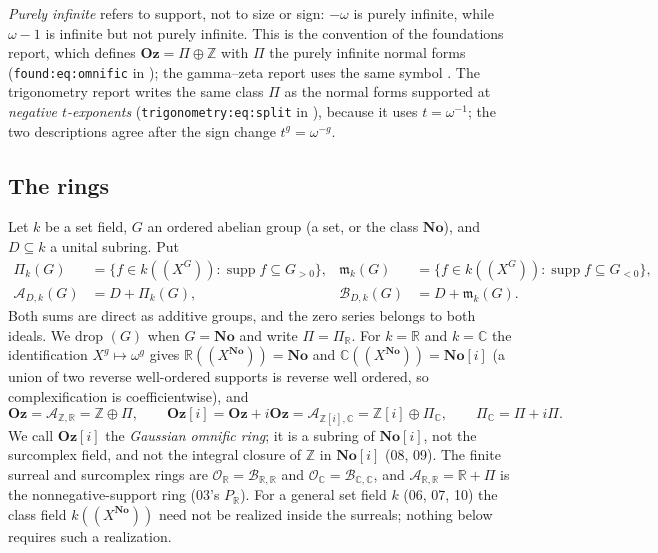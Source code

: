 \documentclass[11pt,letterpaper]{article}
\numberwithin{equation}{section}
\theoremstyle{definition}
\theoremstyle{remark}
\theoremstyle{plain}
\newcommand{\No}{\mathbf{No}}
\newcommand{\Oz}{\mathbf{Oz}}
\newcommand{\SC}{\No[i]}
\newcommand{\GOz}{\Oz[i]}
\newcommand{\Z}{\mathbb Z}
\newcommand{\R}{\mathbb R}
\newcommand{\C}{\mathbb C}
\newcommand{\A}{\mathcal A}          %
\newcommand{\B}{\mathcal B}          %
\newcommand{\mm}{\mathfrak m}        %
\newcommand{\OO}{\mathcal O}         %
\newcommand{\hahn}[2]{#1(\!(X^{#2})\!)}
\newcommand{\supp}{\operatorname{supp}}
\begin{document}
\emph{Purely infinite} refers to support, not to size or sign: $-\omega$ is purely
infinite, while $\omega-1$ is infinite but not purely infinite. This is the convention of
the foundations report, which defines $\Oz=\Pi\oplus\Z$ with $\Pi$ the purely infinite
normal forms (\nolinkurl{found:eq:omnific} in \cite{RepoFound}); the gamma--zeta report
uses the same symbol \cite{RepoGammaZeta}. The trigonometry report writes the same class
$\Pi$ as the normal forms supported at \emph{negative $t$-exponents}
(\nolinkurl{trigonometry:eq:split} in \cite{RepoTrig}), because it uses $t=\omega^{-1}$; the
two descriptions agree after the sign change $t^{g}=\omega^{-g}$.

\subsection{The rings}\label{osq:sub:rings}
Let $k$ be a set field, $G$ an ordered abelian group (a set, or the class $\No$), and
$D\subseteq k$ a unital subring. Put
\begin{align}
 \Pi_k(G)&=\{f\in\hahn kG:\supp f\subseteq G_{>0}\},&
 \mm_k(G)&=\{f\in\hahn kG:\supp f\subseteq G_{<0}\},\label{osq:eq:ideals}\\
 \A_{D,k}(G)&=D+\Pi_k(G),&
 \B_{D,k}(G)&=D+\mm_k(G).\label{osq:eq:rings}
\end{align}
Both sums are direct as additive groups, and the zero series belongs to both ideals.
We drop $(G)$ when $G=\No$ and write $\Pi=\Pi_\R$. For $k=\R$ and $k=\C$ the
identification $X^g\mapsto\omega^g$ gives $\hahn\R\No=\No$ and $\hahn\C\No=\SC$ (a
union of two reverse well-ordered supports is reverse well ordered, so complexification
is coefficientwise), and
\begin{equation}\label{osq:eq:Ozdef}
 \Oz=\A_{\Z,\R}=\Z\oplus\Pi,\qquad
 \GOz=\Oz+i\Oz=\A_{\Z[i],\C}=\Z[i]\oplus\Pi_\C,\qquad \Pi_\C=\Pi+i\Pi .
\end{equation}
We call $\GOz$ the \emph{Gaussian omnific ring}; it is a subring of $\SC$, not the
surcomplex field, and not the integral closure of $\Z$ in $\SC$ (08, 09). The finite
surreal and surcomplex rings are $\OO_\R=\B_{\R,\R}$ and $\OO_\C=\B_{\C,\C}$, and
$\A_{\R,\R}=\R+\Pi$ is the nonnegative-support ring (03's $P_\R$). For a general set
field $k$ (06, 07, 10) the class field $\hahn k\No$ need not be realized inside the
surreals; nothing below requires such a realization.
\end{document}
